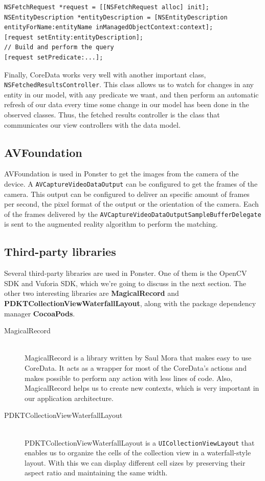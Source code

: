 \begin{verbatim}
NSFetchRequest *request = [[NSFetchRequest alloc] init];
NSEntityDescription *entityDescription = [NSEntityDescription
entityForName:entityName inManagedObjectContext:context];
[request setEntity:entityDescription];
// Build and perform the query
[request setPredicate:...];
\end{verbatim}

Finally, CoreData works very well with another important class,
\texttt{NSFetched\-Results\-Controller}. This class allows us to watch for changes in
any entity in our model, with any predicate we want, and then perform an automatic
refresh of our data every time some change in our model has been done in the
observed classes. Thus, the fetched results controller is the class that communicates
our view controllers with the data model.

\subsection{AVFoundation}
AVFoundation is used in Ponster to get the images from the camera of the device. A
\texttt{AVCaptureVideoDataOutput} can be configured to get the frames of the
camera. This output can be configured to deliver an specific amount of frames per
second, the pixel format of the output or the orientation of the camera. Each of the
frames delivered by the \texttt{AVCaptureVideoDataOutputSample\-Buffer\-Delegate} is
sent to the augmented reality algorithm to perform the matching.

\subsection{Third-party libraries}
Several third-party libraries are used in Ponster. One of them is the OpenCV SDK and
Vuforia SDK, which we're going to discuss in the next section. The other two
interesting libraries are \textbf{MagicalRecord} and
\textbf{PDKTCollectionViewWaterfallLayout}, along with the package dependency
manager \textbf{CocoaPods}.

\begin{description}
\item [MagicalRecord] \hfill \\
MagicalRecord\cite{gh:mr} is a library written by Saul Mora that makes easy to use
CoreData. It acts as a wrapper for most of the CoreData's actions and makes possible
to perform any action with less lines of code. Also, MagicalRecord helps us to create new
contexts, which is very important in our application architecture.
\item [PDKTCollectionViewWaterfallLayout] \hfill \\
PDKTCollectionViewWaterfallLayout is a \texttt{UICollectionViewLayout} that enables
us to organize the cells of the collection view in a waterfall-style layout. With
this we can display different cell sizes by preserving their aspect ratio and
maintaining the same width.
\end{description}

